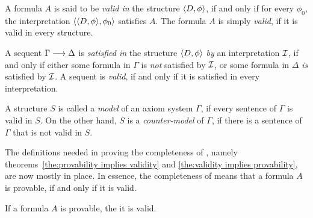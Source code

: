 \documentclass[11pt,a4paper]{article}
\begin{document}
\begin{definition}\label{def:valid formula}
    A formula \(A\) is said to be \emph{valid in} the structure \(\langle D,\phi\rangle\),
    if and only if for every \(\phi_0\),
    the interpretation \(\langle\langle D,\phi\rangle,\phi_0\rangle\)
    satisfies \(A\). The formula \(A\) is simply \emph{valid}, if
    it is valid in every structure.
\end{definition}

\begin{definition}%
\label{def:satisfied and valid sequents}
A sequent \(\Gamma\longrightarrow\Delta\) is \emph{satisfied in} the structure
\(\langle D,\phi\rangle\) \emph{by} an interpretation \(\mathcal{I}\),
if and only if either some formula in \(\Gamma\) is \emph{not}
satisfied by \(\mathcal{I}\), or some formula in \(\Delta\) \emph{is}
satisfied by \(\mathcal{I}\). A sequent is \emph{valid}, if and only if
it is satisfied in every interpretation.
\end{definition}

\begin{definition}%
\label{def:model and counter-model}
A structure \(S\) is called a \emph{model} of an axiom system
\(\Gamma\), if every sentence of \(\Gamma\) is valid in \(S\).
On the other hand, \(S\) is a \emph{counter-model} of \(\Gamma\),
if there is a sentence of \(\Gamma\) that is not valid in \(S\).
\end{definition}

The definitions needed in proving the completeness of \LK{},
namely theorems~\ref{the:provability implies validity}
and \ref{the:validity implies provability},
are now mostly in place. In essence, the completeness of \LK{}
means that a formula \(A\) is provable,
if and only if it is valid.

\begin{theorem}\label{the:provability implies validity}
    If a formula \(A\) is provable, the it is valid.
\end{theorem}
\end{document}
